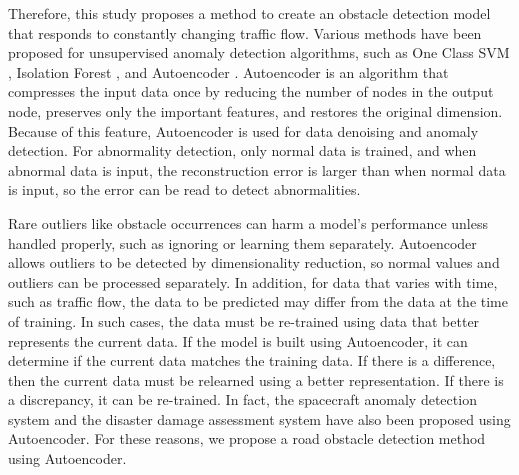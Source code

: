 \documentclass[paper]{ieice}
\begin{document}
Therefore, this study proposes a method to create an obstacle detection model that responds to constantly changing traffic flow.
%
Various methods have been proposed for unsupervised anomaly detection algorithms, such as One Class SVM \cite{chen2001one}, Isolation Forest \cite{isolationforest}, and Autoencoder \cite{bank2021autoencoders}.
%
Autoencoder is an algorithm that compresses the input data once by reducing the number of nodes in the output node, preserves only the important features, and restores the original dimension.
%
Because of this feature, Autoencoder is used for data denoising and anomaly detection.
%
For abnormality detection, only normal data is trained, and when abnormal data is input, the reconstruction error is larger than when normal data is input, so the error can be read to detect abnormalities.
%
\par
%
Rare outliers like obstacle occurrences can harm a model's performance unless handled properly, such as ignoring or learning them separately.
%
Autoencoder allows outliers to be detected by dimensionality reduction, so normal values and outliers can be processed separately.
%
In addition, for data that varies with time, such as traffic flow, the data to be predicted may differ from the data at the time of training.
%
In such cases, the data must be re-trained using data that better represents the current data.
%
If the model is built using Autoencoder, it can determine if the current data matches the training data.
%
If there is a difference, then the current data must be relearned using a better representation.
If there is a discrepancy, it can be re-trained.
%
In fact, the spacecraft anomaly detection system \cite{sakurada} and the disaster damage assessment system \cite{kinami} have also been proposed using Autoencoder.
%
For these reasons, we propose a road obstacle detection method using Autoencoder.
%
\par
%
\end{document}
